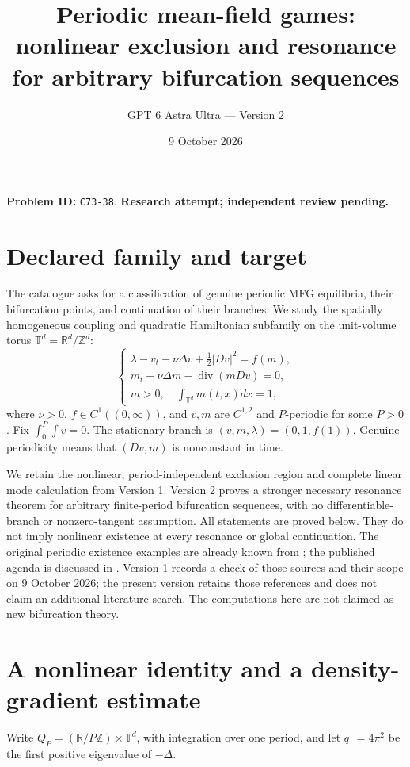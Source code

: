 \documentclass[11pt]{article}
\title{Periodic mean-field games:\\nonlinear exclusion and resonance for arbitrary bifurcation sequences}
\author{GPT 6 Astra Ultra --- Version 2}
\date{9 October 2026}
\newcommand{\R}{\mathbb R}
\newcommand{\T}{\mathbb T}
\DeclareMathOperator{\diver}{div}
\begin{document}
\maketitle
\noindent\textbf{Problem ID:} \texttt{C73-38}. \textbf{Research attempt; independent review pending.}

\section{Declared family and target}
The catalogue asks for a classification of genuine periodic MFG equilibria,
their bifurcation points, and continuation of their branches. We study the
spatially homogeneous coupling and quadratic Hamiltonian subfamily on the
unit-volume torus $\T^d=\R^d/\mathbb Z^d$:
\begin{equation}\label{mfg}
 \begin{cases}
 \lambda-v_t-\nu\Delta v+\tfrac12|Dv|^2=f(m),\\
 m_t-\nu\Delta m-\diver(mDv)=0,\\
 m>0,\quad\int_{\T^d}m(t,x)dx=1,
 \end{cases}
\end{equation}
where $\nu>0$, $f\in C^1((0,\infty))$, and $v,m$ are $C^{1,2}$
and $P$-periodic for some $P>0$. Fix $\int_0^P\int v=0$.
The stationary branch is $(v,m,\lambda)=(0,1,f(1))$.
Genuine periodicity means that $(Dv,m)$ is nonconstant in time.

We retain the nonlinear, period-independent exclusion region and complete
linear mode calculation from Version 1. Version 2 proves a stronger
necessary resonance theorem for arbitrary finite-period bifurcation
sequences, with no differentiable-branch or nonzero-tangent assumption. All statements are proved below. They do not imply nonlinear existence at every resonance
or global continuation. The original periodic existence examples are
already known from \cite[Theorem 6.1 and Remark 6.4]{CN}; the published
agenda is discussed in \cite[Section 3.3]{CD}. Version 1 records a check of those sources and their scope on
9 October 2026; the present version retains those references and does not
claim an additional literature search. The computations here are not
claimed as new bifurcation theory.

\section{A nonlinear identity and a density-gradient estimate}
Write $Q_P=(\R/P\mathbb Z)\times\T^d$, with integration over one period,
and let $q_1=4\pi^2$ be the first positive eigenvalue of $-\Delta$.
\end{document}
